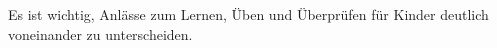 Es ist wichtig, Anlässe zum Lernen, Üben und Überprüfen für Kinder deutlich voneinander zu unterscheiden.